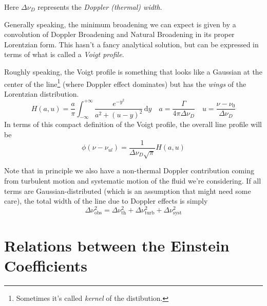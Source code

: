 Here $\Delta \nu_{D}$ represents the \emph{Doppler (thermal) width}.
\par Generally speaking, the minimum broadening we can expect is given by a convolution of Doppler Broadening and Natural Broadening in its proper Lorentzian form. This hasn't a fancy analytical solution, but can be expressed in terms of what is called a \emph{Voigt profile}.
\par Roughly speaking, the Voigt profile is something that looks like a Gaussian at the center of the line\footnote{Sometimes it's called \emph{kernel} of the distibution.} (where Doppler effect dominates) but has the 
\emph{wings} of the Lorentzian distribution.
\begin{equation*}
    H(a,u) = \frac{a}{\pi}\int_{-\infty}^{+\infty} \frac{e^{-y^{2}}}{a^{2}+(u-y)^{2}}\,\text{d}y \quad a = \frac{\Gamma}{4\pi\Delta\nu_{D}} \quad u = \frac{\nu-\nu_{0}}{\Delta\nu_{D}}
\end{equation*}
In terms of this compact definition of the Voigt profile, the overall line profile will be
\begin{equation*}
    \phi(\nu-\nu_{ul}) = \frac{1}{\Delta\nu_{D}\sqrt{\pi}}H(a,u)
\end{equation*}
\par Note that in principle we also have a non-thermal Doppler contribution coming from turbulent motion and systematic motion of the fluid we're considering. If all terms are Gaussian-distributed (which is an assumption that might need some care), the total width of the line due to Doppler effects is simply 
\begin{equation*}
    \Delta \nu_{\text{obs}}^{2} = \Delta \nu_{\text{th}}^{2} + \Delta\nu_{\text{turb}}^{2}+\Delta\nu_{\text{syst}}^{2}
\end{equation*}

\section{Relations between the Einstein Coefficients}

